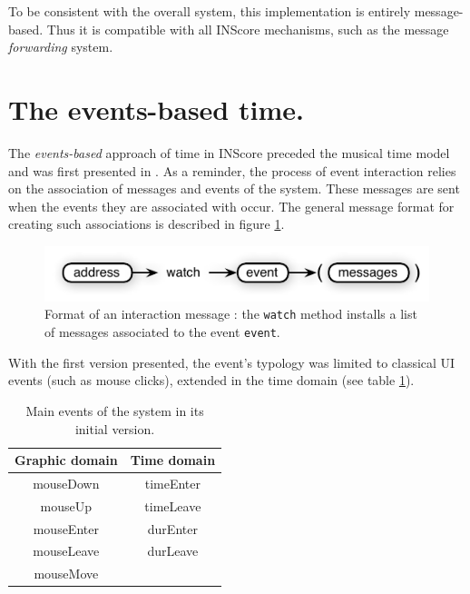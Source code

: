 \documentclass{article}
\newcommand{\OSC}[1]	{{\fontsize{8.5pt}{8pt} \selectfont\texttt{#1}}}
\begin{document}
To be consistent with the overall system, this implementation is entirely message-based. Thus it is compatible with all INScore mechanisms, such as the message \emph{forwarding} system.

\section{The events-based time.}\label{evtime}

The \emph{events-based} approach of time in INScore preceded the musical time model and was first presented in \cite{Fober:13b}. As a reminder, the process of event interaction relies on the association of messages and events of the system. These messages are sent when the events they are associated with occur. The general message format for creating such associations is described in figure \ref{fig:watch}.

\begin{figure}[htbp]
\centerline{
	\includegraphics[width=0.95\columnwidth]{imgs/watch}}
\caption{Format of an interaction message : the \OSC{watch} method installs a list of messages associated to the event\OSC{event}.}
\label{fig:watch}
\end{figure}

With the first version presented, the event's typology was limited to classical UI events (such as mouse clicks), extended in the time domain (see table \ref{tbl:evts}). 

\begin{table}[htp]
\begin{center}
\begin{tabular}{c|c}
Graphic domain & Time domain \\
\hline
mouseDown 		& timeEnter	\\
mouseUp			& timeLeave	\\
mouseEnter		& durEnter		\\
mouseLeave		& durLeave		\\
mouseMove		&				\\
\end{tabular}
\end{center}
\caption{Main events of the system in its initial version.}
\label{tbl:evts}
\end{table}%
\end{document}
